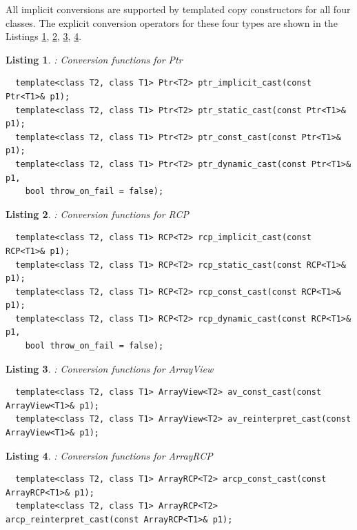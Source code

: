 \documentclass[pdf,ps2pdf,11pt]{SANDreport}
\newtheorem{listing}{Listing}
\begin{document}
All implicit conversions are supported by templated copy constructors
for all four classes.  The explicit conversion operators for these
four types are shown in the Listings {}\ref{listing:Ptr-conversions},
{}\ref{listing:RCP-conversions},
{}\ref{listing:ArrayView-conversions},
{}\ref{listing:ArrayRCP-conversions}.

\begin{listing}: Conversion functions for Ptr\\
\label{listing:Ptr-conversions}
{\small\begin{verbatim}
  template<class T2, class T1> Ptr<T2> ptr_implicit_cast(const Ptr<T1>& p1);
  template<class T2, class T1> Ptr<T2> ptr_static_cast(const Ptr<T1>& p1);
  template<class T2, class T1> Ptr<T2> ptr_const_cast(const Ptr<T1>& p1);
  template<class T2, class T1> Ptr<T2> ptr_dynamic_cast(const Ptr<T1>& p1,
    bool throw_on_fail = false);
\end{verbatim}}
\end{listing}

\begin{listing}: Conversion functions for RCP\\
\label{listing:RCP-conversions}
{\small\begin{verbatim}
  template<class T2, class T1> RCP<T2> rcp_implicit_cast(const RCP<T1>& p1);
  template<class T2, class T1> RCP<T2> rcp_static_cast(const RCP<T1>& p1);
  template<class T2, class T1> RCP<T2> rcp_const_cast(const RCP<T1>& p1);
  template<class T2, class T1> RCP<T2> rcp_dynamic_cast(const RCP<T1>& p1,
    bool throw_on_fail = false);
\end{verbatim}}
\end{listing}

\begin{listing}: Conversion functions for ArrayView\\
\label{listing:ArrayView-conversions}
{\small\begin{verbatim}
  template<class T2, class T1> ArrayView<T2> av_const_cast(const ArrayView<T1>& p1);
  template<class T2, class T1> ArrayView<T2> av_reinterpret_cast(const ArrayView<T1>& p1);
\end{verbatim}}
\end{listing}

\begin{listing}: Conversion functions for ArrayRCP\\
\label{listing:ArrayRCP-conversions}
{\small\begin{verbatim}
  template<class T2, class T1> ArrayRCP<T2> arcp_const_cast(const ArrayRCP<T1>& p1);
  template<class T2, class T1> ArrayRCP<T2> arcp_reinterpret_cast(const ArrayRCP<T1>& p1);
\end{verbatim}}
\end{listing}
\end{document}
